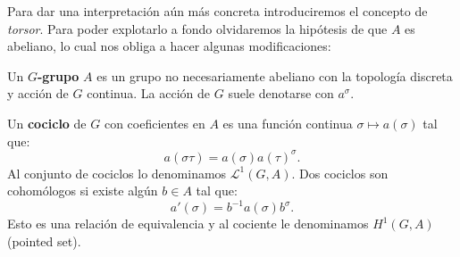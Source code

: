 \documentclass[a4paper,12pt, leqno]{report}
\begin{document}
Para dar una interpretación aún más concreta introduciremos el concepto de \textit{torsor}. Para poder explotarlo a fondo olvidaremos la hipótesis de que $A$ es abeliano, lo cual nos obliga a hacer algunas modificaciones:
\begin{definicion}
	Un \textbf{$G$-grupo} $A$ es un grupo no necesariamente abeliano con la topología discreta y acción de $G$ continua. La acción de $G$ suele denotarse con $a^{\sigma}$. 
	
	Un \textbf{cociclo} de $G$ con coeficientes en $A$ es una función continua $\sigma \mapsto a(\sigma)$ tal que:
	\begin{equation*}
	a(\sigma \tau)=a(\sigma)a(\tau)^{\sigma}.
	\end{equation*}
	Al conjunto de cociclos lo denominamos $\mathscr{L}^1(G,A)$. Dos cociclos son cohomólogos si existe algún $b\in A$ tal que:
	\begin{equation*}
	a'(\sigma)=b^{-1}a(\sigma) b^{\sigma}.
	\end{equation*}
	Esto es una relación de equivalencia y al cociente le denominamos $H^1(G,A)$ (pointed set).
\end{definicion}
\end{document}
